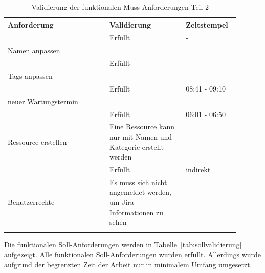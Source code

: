 \begin{longtable}{| P{0.4\linewidth} | P{0.3\linewidth} | P{0.2\linewidth} |} 
  \hline
  \textbf{Anforderung} & \textbf{Validierung} & \textbf{Zeitstempel}\\ [0.5ex]  \hline
   & Erfüllt & - \\
  Namen anpassen &  & \\ [0.5ex] \hline

   & Erfüllt & - \\
  Tags anpassen &  & \\ [0.5ex] \hline

   & Erfüllt & 08:41 - 09:10 \\
  neuer Wartungstermin &  & \\ [0.5ex] \hline

   & Erfüllt & 06:01 - 06:50 \\
  Ressource erstellen & Eine Ressource kann nur mit Namen und Kategorie erstellt werden & \\ [0.5ex] \hline

   & Erfüllt & indirekt \\
  Benutzerrechte & Es muss sich nicht angemeldet werden, um \gls{Jira} Informationen zu sehen & \\ [0.5ex] \hline
  
  \caption{Validierung der funktionalen Muss-Anforderungen Teil 2}\label{tab:mussvalidierung}
\end{longtable}

Die funktionalen Soll-Anforderungen werden in Tabelle~\ref{tab:sollvalidierung} aufgezeigt.
Alle funktionalen Soll-Anforderungen wurden erfüllt. Allerdings wurde 
aufgrund der begrenzten Zeit der Arbeit nur in minimalem Umfang umgesetzt.

\newpage

